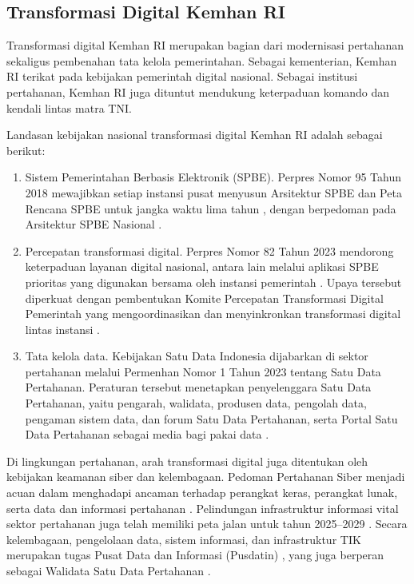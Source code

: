 \subsection{Transformasi Digital Kemhan RI}
\label{sec:II.2.4}

Transformasi digital Kemhan RI merupakan bagian dari modernisasi pertahanan sekaligus pembenahan tata kelola pemerintahan. Sebagai kementerian, Kemhan RI terikat pada kebijakan pemerintah digital nasional. Sebagai institusi pertahanan, Kemhan RI juga dituntut mendukung keterpaduan komando dan kendali lintas matra TNI.

Landasan kebijakan nasional transformasi digital Kemhan RI adalah sebagai berikut:
\begin{enumerate}[label=\arabic*.]
\item Sistem Pemerintahan Berbasis Elektronik (SPBE). Perpres Nomor 95 Tahun 2018 mewajibkan setiap instansi pusat menyusun Arsitektur SPBE dan Peta Rencana SPBE untuk jangka waktu lima tahun \cite{Perpres95Tahun2018}, dengan berpedoman pada Arsitektur SPBE Nasional \cite{Perpres132Tahun2022}.
\item Percepatan transformasi digital. Perpres Nomor 82 Tahun 2023 mendorong keterpaduan layanan digital nasional, antara lain melalui aplikasi SPBE prioritas yang digunakan bersama oleh instansi pemerintah \cite{Perpres82Tahun2023}. Upaya tersebut diperkuat dengan pembentukan Komite Percepatan Transformasi Digital Pemerintah yang mengoordinasikan dan menyinkronkan transformasi digital lintas instansi \cite{Perpres83Tahun2025}.
\item Tata kelola data. Kebijakan Satu Data Indonesia dijabarkan di sektor pertahanan melalui Permenhan Nomor 1 Tahun 2023 tentang Satu Data Pertahanan. Peraturan tersebut menetapkan penyelenggara Satu Data Pertahanan, yaitu pengarah, walidata, produsen data, pengolah data, pengaman sistem data, dan forum Satu Data Pertahanan, serta Portal Satu Data Pertahanan sebagai media bagi pakai data \cite{Permenhan1Tahun2023}.
\end{enumerate}

Di lingkungan pertahanan, arah transformasi digital juga ditentukan oleh kebijakan keamanan siber dan kelembagaan. Pedoman Pertahanan Siber menjadi acuan dalam menghadapi ancaman terhadap perangkat keras, perangkat lunak, serta data dan informasi pertahanan \cite{Permenhan82Tahun2014}. Pelindungan infrastruktur informasi vital sektor pertahanan juga telah memiliki peta jalan untuk tahun 2025–2029 \cite{Permenhan34Tahun2025}. Secara kelembagaan, pengelolaan data, sistem informasi, dan infrastruktur TIK merupakan tugas Pusat Data dan Informasi (Pusdatin) \cite{Permenhan30Tahun2025}, yang juga berperan sebagai Walidata Satu Data Pertahanan \cite{Pusdatin2026SatuData}.

